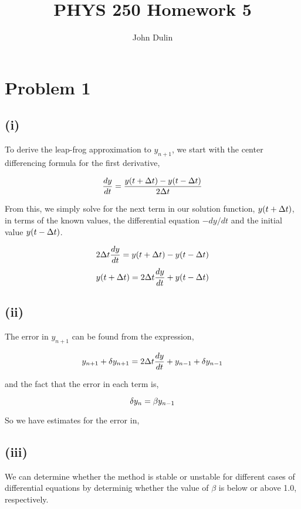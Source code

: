 \documentclass{article}
\author{John Dulin}
\title{PHYS 250 Homework 5}
\begin{document}
\maketitle

\section*{Problem 1}

\subsection*{(i)}
To derive the leap-frog approximation to $y_{n+1}$, we start with the center differencing formula for the first derivative,

$$ \frac{dy}{dt} = \frac{y(t + \Delta\/t) - y(t - \Delta\/t)}{2\Delta\/t} $$

From this, we simply solve for the next term in our solution function, $y(t + \Delta\/t)$, in terms of the 
known values, the differential equation $-dy/dt$ and the initial value $y(t - \Delta\/t)$.

$$ 2\Delta\/t\frac{dy}{dt} = y(t + \Delta\/t) - y(t - \Delta\/t)   $$
$$ y(t + \Delta\/t) = 2\Delta\/t\frac{dy}{dt} + y(t - \Delta\/t) $$ 

\subsection*{(ii)}

The error in $y_{n+1}$ can be found from the expression,

$$ y_{n+1} + \delta\/y_{n+1} = 2\Delta\/t\frac{dy}{dt} + y_{n-1}+  \delta\/y_{n-1} $$

and the fact that the error in each term is,

$$ \delta\/y_{n} = \beta\/y_{n-1} $$

So we have estimates for the error in,

\vspace{30 mm}

\subsection*{(iii)}
We can determine whether the method is stable or unstable for different cases of differential equations by determinig whether the value of $\beta$ is below or above 1.0, respectively.

\vspace{70 mm}
\end{document}
